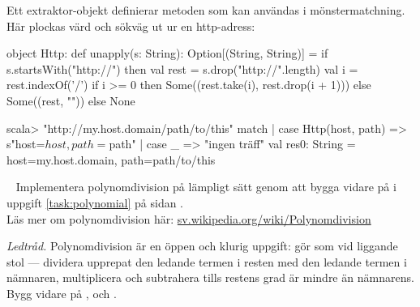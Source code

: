 \SOLUTION


\TaskSolved \what
Ett extraktor-objekt definierar metoden  som kan användas i mönstermatchning. Här plockas värd och sökväg ut ur en http-adress:
\begin{Code}
object Http:
  def unapply(s: String): Option[(String, String)] =
    if s.startsWith("http://") then
      val rest = s.drop("http://".length)
      val i = rest.indexOf('/')
      if i >= 0 then Some((rest.take(i), rest.drop(i + 1)))
      else Some((rest, ""))
    else None
\end{Code}
\begin{REPL}
scala> "http://my.host.domain/path/to/this" match
     |   case Http(host, path) => s"host=$host, path=$path"
     |   case _                => "ingen träff"
val res0: String = host=my.host.domain, path=path/to/this
\end{REPL}



\QUESTEND





\QUESTBEGIN

\Task  \what~ Implementera polynomdivision på lämpligt sätt genom att bygga vidare på   i  uppgift \ref{task:polynomial} på sidan \pageref{task:polynomial}.  \\ Läs mer om polynomdivision här: \href{https://sv.wikipedia.org/wiki/Polynomdivision}{sv.wikipedia.org/wiki/Polynomdivision}

\SOLUTION


\TaskSolved \what
\emph{Ledtråd.} Polynomdivision är en öppen och klurig uppgift: gör som vid liggande stol --- dividera upprepat den ledande termen i resten med den ledande termen i nämnaren, multiplicera och subtrahera tills restens grad är mindre än nämnarens. Bygg vidare på \code{*}, \code{+} och .

\QUESTEND
